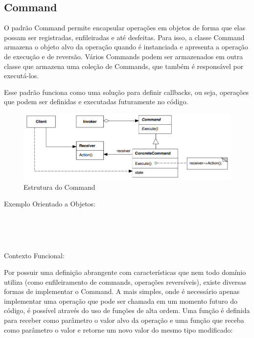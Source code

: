 \subsection{Command}

O padrão Command permite encapsular operações em objetos 
de forma que elas possam ser registradas, enfileiradas 
e até desfeitas. Para isso, a classe Command armazena o 
objeto alvo da operação quando é instanciada e apresenta 
a operação de execução e de reversão. Vários Commands 
podem ser armazenados em outra classe que armazena uma 
coleção de Commands, que também é responsável por 
executá-los.

Esse padrão funciona como uma solução para definir 
callbacks, ou seja, operações que podem ser definidas 
e executadas futuramente no código.

\begin{figure}[htb]
	\caption{\label{fig_grafico}Estrutura do Command}
	\begin{center}
	    \includegraphics[scale=0.5]{5_padroes-contexto-funcional/5.3_comportamentais/5.3.02_command/diagram.png}
	\end{center}
\end{figure}

Exemplo Orientado a Objetos:

\begin{lstlisting}[caption={Command Orientação a Objetos},label=oocommand]


    
\end{lstlisting}

Contexto Funcional:

Por possuir uma definição abrangente com características 
que nem todo domínio utiliza (como enfileiramento de 
commands, operações reversíveis), existe diversas formas 
de implementar o Command. A mais simples, onde é necessário 
apenas implementar uma operação que pode ser chamada em 
um momento futuro do código, é possível através do uso 
de funções de alta ordem. Uma função é definida para 
receber como parâmetro o valor alvo da operação e uma 
função que receba como parâmetro o valor e retorne um 
novo valor do mesmo tipo modificado:

